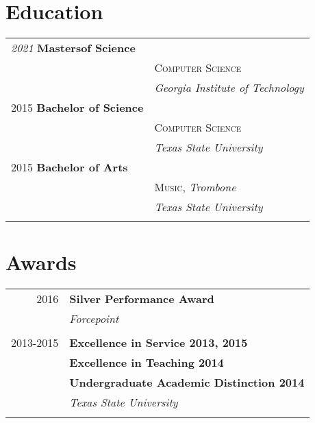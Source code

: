 \documentclass[10pt]{article} %
\begin{document}
\begin{minipage}[t]{0.44\textwidth}
\section{Education} 

\begin{tabular}{ll} %

\textit{2021} \textbf{Mastersof Science}\\
& \textsc{Computer Science}\\
& \textit{Georgia Institute of Technology}\\

2015 \textbf{Bachelor of Science} \\ 
& \textsc{Computer Science} \\ 
& \textit{Texas State University}\\

	 

2015 \textbf{Bachelor of Arts} \\ 
& \textsc{Music}, \textit{Trombone}\\ 
& \textit{Texas State University}\\ \\

\end{tabular}


\section{Awards} 

\begin{tabular}{rl}
2016     & \textbf{Silver Performance Award}\\
& \textit{Forcepoint}\\ \\

2013-2015     & \textbf{Excellence in Service 2013, 2015}\\
& \textbf{Excellence in Teaching 2014}\\
& \textbf{Undergraduate Academic Distinction 2014}\\
& \textit{Texas State University}\\\\


\end{tabular}
\end{minipage}
\end{document}
